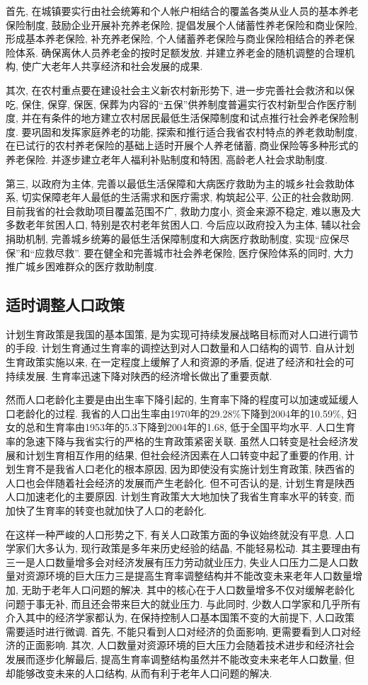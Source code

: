 \documentclass[a4paper, 12pt, UTF8]{article}
\begin{document}
首先, 在城镇要实行由社会统筹和个人帐户相结合的覆盖各类从业人员的基本养老保险制度, 鼓励企业开展补充养老保险, 提倡发展个人储蓄性养老保险和商业保险, 形成基本养老保险, 补充养老保险, 个人储蓄养老保险与商业保险相结合的养老保险体系. 确保离休人员养老金的按时足额发放. 并建立养老金的随机调整的合理机构, 使广大老年人共享经济和社会发展的成果. 

其次, 在农村重点要在建设社会主义新农村新形势下, 进一步完善社会救济和以保吃, 保住, 保穿, 保医, 保葬为内容的``五保''供养制度普遍实行农村新型合作医疗制度, 并在有条件的地方建立农村居民最低生活保障制度和试点推行社会养老保险制度. 要巩固和发挥家庭养老的功能, 探索和推行适合我省农村特点的养老救助制度, 在已试行的农村养老保险的基础上适时开展个人养老储蓄, 商业保险等多种形式的养老保险. 并逐步建立老年人福利补贴制度和特困, 高龄老人社会求助制度. 

第三, 以政府为主体, 完善以最低生活保障和大病医疗救助为主的城乡社会救助体系, 切实保障老年人最低的生活需求和医疗需求, 构筑起公平, 公正的社会救助网. 目前我省的社会救助项目覆盖范围不广, 救助力度小, 资金来源不稳定, 难以惠及大多数老年贫困人口, 特别是农村老年贫困人口. 今后应以政府投入为主体, 辅以社会捐助机制, 完善城乡统筹的最低生活保障制度和大病医疗救助制度, 实现``应保尽保''和``应救尽救''. 要在健全和完善城市社会养老保险, 医疗保险体系的同时, 大力推广城乡困难群众的医疗救助制度. 

\subsection{适时调整人口政策}
计划生育政策是我国的基本国策, 是为实现可持续发展战略目标而对人口进行调节的手段. 计划生育通过生育率的调控达到对人口数量和人口结构的调节. 自从计划生育政策实施以来, 在一定程度上缓解了人和资源的矛盾, 促进了经济和社会的可持续发展. 生育率迅速下降对陕西的经济增长做出了重要贡献. 

然而人口老龄化主要是由出生率下降引起的, 生育率下降的程度可以加速或延缓人口老龄化的过程. 我省的人口出生率由1970年的29.28\%下降到2004年的10.59\%, 妇女的总和生育率由1953年的5.3下降到2004年的1.68, 低于全国平均水平. 人口生育率的急速下降与我省实行的严格的生育政策紧密关联. 虽然人口转变是社会经济发展和计划生育相互作用的结果, 但社会经济因素在人口转变中起了重要的作用, 计划生育不是我省人口老化的根本原因, 因为即使没有实施计划生育政策, 陕西省的人口也会伴随着社会经济的发展而产生老龄化. 但不可否认的是, 计划生育是陕西人口加速老化的主要原因. 计划生育政策大大地加快了我省生育率水平的转变, 而加快了生育率的转变也就加快了人口的老龄化. 

在这样一种严峻的人口形势之下, 有关人口政策方面的争议始终就没有平息. 人口学家们大多认为, 现行政策是多年来历史经验的结晶, 不能轻易松动. 其主要理由有三一是人口数量增多会对经济发展有压力劳动就业压力, 失业人口压力二是人口数量对资源环境的巨大压力三是提高生育率调整结构并不能改变未来老年人口数量增加, 无助于老年人口问题的解决. 其中的核心在于人口数量增多不仅对缓解老龄化问题于事无补, 而且还会带来巨大的就业压力. 与此同时, 少数人口学家和几乎所有介入其中的经济学家都认为, 在保持控制人口基本国策不变的大前提下, 人口政策需要适时进行微调. 首先, 不能只看到人口对经济的负面影响, 更需要看到人口对经济的正面影响. 其次, 人口数量对资源环境的巨大压力会随着技术进步和经济社会发展而逐步化解最后, 提高生育率调整结构虽然并不能改变未来老年人口数量, 但却能够改变未来的人口结构, 从而有利于老年人口问题的解决. 
\end{document}
